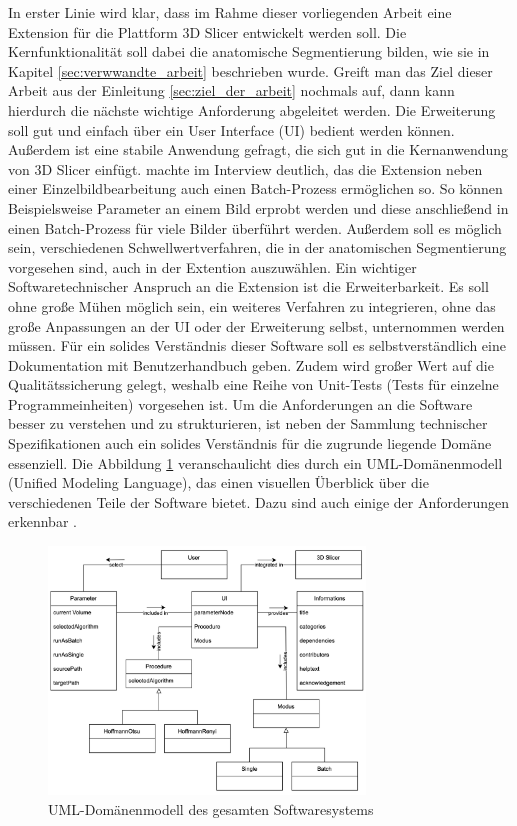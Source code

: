 In erster Linie wird klar, dass im Rahme dieser vorliegenden Arbeit eine
Extension für die Plattform 3D Slicer entwickelt werden soll. Die Kernfunktionalität
soll dabei die anatomische Segmentierung bilden, wie sie in Kapitel
\ref{sec:verwwandte_arbeit} beschrieben wurde. Greift man das Ziel dieser Arbeit
aus der Einleitung \ref{sec:ziel_der_arbeit} nochmals auf, dann kann hierdurch
die nächste wichtige Anforderung abgeleitet werden. Die Erweiterung soll gut und
einfach über ein User Interface (UI) bedient werden können. Außerdem ist eine
stabile Anwendung gefragt, die sich gut in die Kernanwendung von 3D Slicer einfügt.
\citet[]{walter2025} machte im Interview deutlich, das die Extension neben einer
Einzelbildbearbeitung auch einen Batch-Prozess ermöglichen so. So können Beispielsweise
Parameter an einem Bild erprobt werden und diese anschließend in einen Batch-Prozess
für viele Bilder überführt werden. Außerdem soll es möglich sein, verschiedenen Schwellwertverfahren,
die in der anatomischen Segmentierung vorgesehen sind, auch in der Extention auszuwählen.
Ein wichtiger Softwaretechnischer Anspruch an die Extension ist die
Erweiterbarkeit. Es soll ohne große Mühen möglich sein, ein weiteres Verfahren
zu integrieren, ohne das große Anpassungen an der UI oder der Erweiterung selbst,
unternommen werden müssen. Für ein solides Verständnis dieser Software soll es selbstverständlich
eine Dokumentation mit Benutzerhandbuch geben. Zudem wird großer Wert auf die
Qualitätssicherung gelegt, weshalb eine Reihe von Unit-Tests (Tests für einzelne
Programmeinheiten) vorgesehen ist. Um die Anforderungen an die Software besser
zu verstehen und zu strukturieren, ist neben der Sammlung technischer Spezifikationen
auch ein solides Verständnis für die zugrunde liegende Domäne essenziell. Die
Abbildung \ref{fig:3d_slicer_domäne} veranschaulicht dies durch ein UML-Domänenmodell
(Unified Modeling Language), das einen visuellen Überblick über die verschiedenen
Teile der Software bietet. Dazu sind auch einige der Anforderungen erkennbar
\citep[vgl.][]{walter2025}.

\begin{figure}[h]
	\centering
	\includegraphics[width=0.75\textwidth]{img/domaenenmodell.jpg}
	\caption{UML-Domänenmodell des gesamten Softwaresystems}
	\label{fig:3d_slicer_domäne}
\end{figure}

